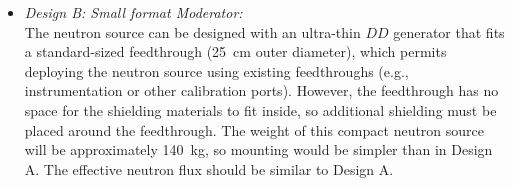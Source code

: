 \begin{itemize}
\item {\it Design B: Small format Moderator:}\\
The neutron source can be designed with an ultra-thin $DD$ generator that fits a standard-sized feedthrough (\SI{25}{\cm} outer diameter), which permits deploying the neutron source using existing feedthroughs (e.g., instrumentation or other calibration ports). However, the feedthrough has no space for the shielding materials to fit inside, so additional shielding must be placed around the feedthrough. The weight of this compact neutron source will be approximately \SI{140}{\kg}, so mounting would be simpler than in Design A. The effective neutron flux should be similar to Design A. 
\end{itemize}


